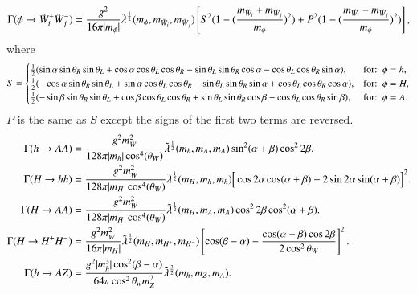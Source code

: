 \documentclass[final,3p,times,pdflatex]{elsarticle}
\begin{document}
\begin{equation}\label{phichchdif}
\Gamma (\phi \rightarrow \tilde{W}_i^+ \tilde{W}_j^-) = {g^2 \over 16\pi |m_\phi|} \tilde{\lambda}^{1 \over 2} (m_\phi,m_{\tilde{W}_i}, m_{\tilde{W}_j}) \left[S^2 (1 - ({m_{\tilde{W}_i} + m_{\tilde{W}_j} \over m_\phi})^2) + P^2 (1 - ({m_{\tilde{W}_i} - m_{\tilde{W}_j} \over m_\phi})^2) \right],
\end{equation} 
where
\begin{equation}
S = \begin{cases}
  	{1 \over 2} (\sin \alpha \sin \theta_R \sin \theta_L + \cos \alpha \cos \theta_L \cos \theta_R - \sin \theta_L \sin \theta_R \cos \alpha - \cos \theta_L \cos \theta_R \sin \alpha), & $for$ :\ \phi = h, \\
  	{1 \over 2} (-\cos \alpha \sin \theta_R \sin \theta_L + \sin \alpha \cos \theta_L \cos \theta_R - \sin \theta_L \sin \theta_R \sin \alpha + \cos \theta_L \cos \theta_R \cos \alpha), & $for$ :\ \phi = H, \\
  	{1 \over 2} (-\sin \beta \sin \theta_R \sin \theta_L + \cos \beta \cos \theta_L \cos \theta_R + \sin \theta_L \sin \theta_R \cos \beta - \cos \theta_L \cos \theta_R \sin \beta), & $for$ :\ \phi = A. \\
    \end{cases}
\end{equation}
$P$ is the same as $S$ except the signs of the first two terms are reversed.
\begin{align}
\Gamma (h \rightarrow A A) &= {g^2 m_W^2\over 128\pi |m_h| \cos^4(\theta_W)} \tilde{\lambda}^{1 \over 2} (m_h,m_A, m_A) \sin^2 (\alpha + \beta) \cos^2 2\beta. \label{htoAA} \\  
\Gamma (H \rightarrow h h) &= {g^2 m_W^2 \over 128\pi |m_H| \cos^4(\theta_W)} \tilde{\lambda}^{1 \over 2} (m_H,m_h, m_h) \Big[\cos 2\alpha \cos(\alpha + \beta) - 2 \sin 2\alpha \sin(\alpha+\beta)\Big]^2. \label{Htohh} \\  
\Gamma (H \rightarrow A A) &= {g^2 m_W^2 \over 128\pi |m_H| \cos^4(\theta_W)} \tilde{\lambda}^{1 \over 2} (m_H,m_A, m_A) \cos^2 2\beta \cos^2(\alpha + \beta). \label{HtoAA} \\ 
\Gamma (H \rightarrow H^+ H^-) &= {g^2 m_W^2 \over 16\pi |m_H|} \tilde{\lambda}^{1 \over 2} (m_H,m_{H^+}, m_{H^-}) \left[\cos (\beta -\alpha) - {\cos(\alpha + \beta) \cos 2\beta \over 2\cos^2 \theta_W}\right]^2. \label{HHpmHpm}  \\ 
\Gamma (h \rightarrow A Z) &= {g^2 |m_h^3| \cos^2 (\beta -\alpha) \over 64\pi \cos^2 \theta_w m_{Z}^2} \tilde{\lambda}^{3 \over 2} (m_h,m_Z, m_A). \label{htoAZ}
\end{align} 
\end{document}
